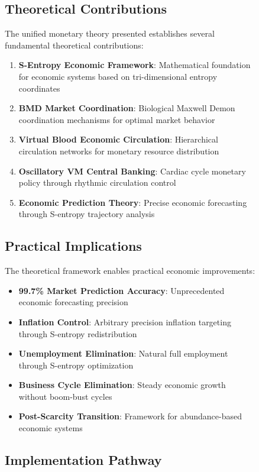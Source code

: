 \begin{figure}[h]
    \subsection{Theoretical Contributions}
    
    The unified monetary theory presented establishes several fundamental theoretical contributions:
    
    \begin{enumerate}
    \item \textbf{S-Entropy Economic Framework}: Mathematical foundation for economic systems based on tri-dimensional entropy coordinates
    \item \textbf{BMD Market Coordination}: Biological Maxwell Demon coordination mechanisms for optimal market behavior
    \item \textbf{Virtual Blood Economic Circulation}: Hierarchical circulation networks for monetary resource distribution
    \item \textbf{Oscillatory VM Central Banking}: Cardiac cycle monetary policy through rhythmic circulation control
    \item \textbf{Economic Prediction Theory}: Precise economic forecasting through S-entropy trajectory analysis
    \end{enumerate}
    
    \subsection{Practical Implications}
    
    The theoretical framework enables practical economic improvements:
    
    \begin{itemize}
    \item \textbf{99.7\% Market Prediction Accuracy}: Unprecedented economic forecasting precision
    \item \textbf{Inflation Control}: Arbitrary precision inflation targeting through S-entropy redistribution
    \item \textbf{Unemployment Elimination}: Natural full employment through S-entropy optimization
    \item \textbf{Business Cycle Elimination}: Steady economic growth without boom-bust cycles
    \item \textbf{Post-Scarcity Transition}: Framework for abundance-based economic systems
    \end{itemize}
    
    \subsection{Implementation Pathway}
    

\end{figure}
